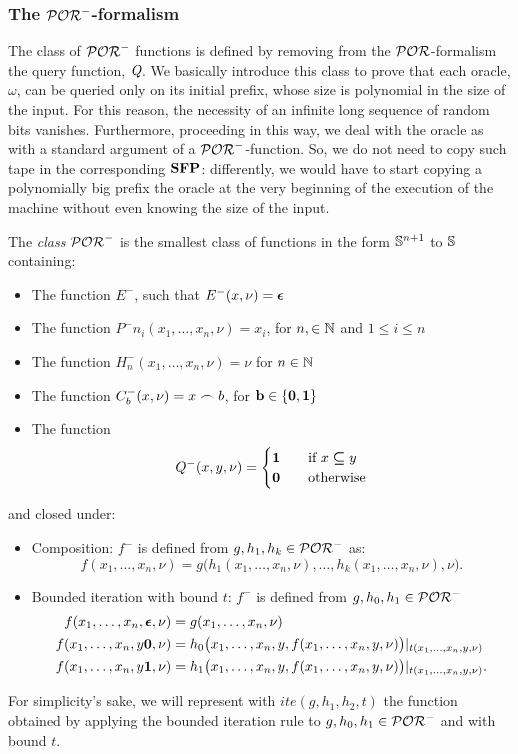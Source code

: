 \subsubsection{The $\mathcal{POR}^-$-formalism}

The class of $\mathcal{POR}^{-}$ functions is defined by removing
from the $\mathcal{POR}$-formalism
the query function, $\emph{Q}$.
%
We basically introduce this class to prove that
each oracle, $\omega$, can be queried only
on its initial prefix, whose size
is polynomial in the size of the input.
For this reason, the necessity of an infinite
long sequence of random bits vanishes.
%
Furthermore, proceeding in this way,
we deal with the oracle as with a standard
argument of a $\mathcal{POR}^-$-function.
%
So, we do not need to copy such tape
in the corresponding $\mathbf{SFP}$:
differently, we would have to start copying
a polynomially big prefix the oracle at the very
beginning of the execution of the machine
without even knowing the size of the input.


\begin{defn}
The \emph{class} $\mathcal{POR}^-$ is the smallest class of functions
in the form $\mathbb{S}^{n+1}$ to $\mathbb{S}$ containing:
\begin{itemize}
\itemsep0em
\item The function $E^-$, such that $E^-(x,\nu)=\bm{\epsilon}$
%
\item The function $P^-{n}_i(x_1,\dots, x_n,\nu)=x_i$,
for $n,\in\mathbb{N}$ and $1\leq i\leq n$
%
\item The function $H^{-}_n(x_1,\dots, x_n,\nu)=\nu$ for $n\in\mathbb{N}$
%
\item The function $C^{-}_b(x,\nu)=x\frown b$, for $\mathbf{b}\in\{\mathbf{0},\mathbf{1}\}$
%
\item The function
$$
Q^{-}(x,y,\nu) = \begin{cases}
\mathbf{1} \ \ \ &\text{if } x \bm{\subseteq} y \\
\mathbf{0} \ \ \ &\text{otherwise}
\end{cases}
$$
\end{itemize}
and closed under:
\begin{itemize}
\item Composition: $f^-$ is defined from $g,h_1,h_k\in\mathcal{POR}^-$ as:
$$
f(x_1,\dots, x_n,\nu) = g\big(h_1(x_1,\dots, x_n,\nu),\dots, h_k(x_1,\dots, x_n,\nu),\nu\big).
$$
\item Bounded iteration with bound $t$: $f^-$ is defined from $g,h_0,h_1\in \mathcal{POR}^-$
\begin{align*}
f(x_1,\dots, x_n,\bm{\epsilon},\nu) &= g(x_1,\dots, x_n,\nu) \\
f(x_1,\dots, x_n,y\mathbf{0},\nu) &= h_0\big(x_1,\dots, x_n,y,f(x_1,\dots, x_n,y,\nu)\big)|_{t(x_1,\dots, x_n,y,\nu)} \\
f(x_1,\dots, x_n,y\mathbf{1},\nu) &= h_1\big(x_1,\dots, x_n,y, f(x_1,\dots, x_n,y,\nu)\big)|_{t(x_1,\dots, x_n,y,\nu)}.
\end{align*}
\end{itemize}
\noindent
For simplicity's sake, we will represent with $ite(g,h_1,h_2,t)$ the function
obtained by applying the bounded iteration rule to $g,h_0,h_1 \in\mathcal{POR}^-$
and with bound $t$.
\end{defn}

